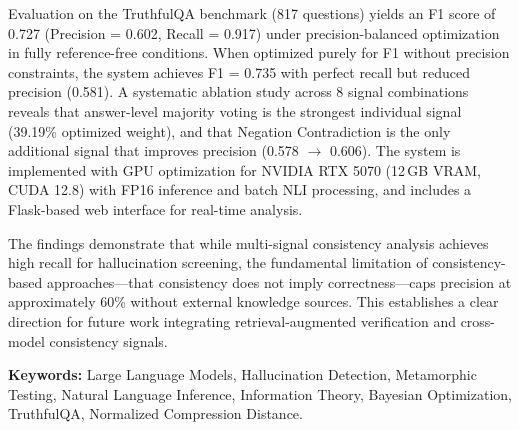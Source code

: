 Evaluation on the TruthfulQA benchmark (817 questions) yields an F1 score of 0.727 (Precision = 0.602, Recall = 0.917) under precision-balanced optimization in fully reference-free conditions. When optimized purely for F1 without precision constraints, the system achieves F1 = 0.735 with perfect recall but reduced precision (0.581). A systematic ablation study across 8 signal combinations reveals that answer-level majority voting is the strongest individual signal (39.19\% optimized weight), and that Negation Contradiction is the only additional signal that improves precision (0.578 $\rightarrow$ 0.606). The system is implemented with GPU optimization for NVIDIA RTX 5070 (12\,GB VRAM, CUDA 12.8) with FP16 inference and batch NLI processing, and includes a Flask-based web interface for real-time analysis.

The findings demonstrate that while multi-signal consistency analysis achieves high recall for hallucination screening, the fundamental limitation of consistency-based approaches---that consistency does not imply correctness---caps precision at approximately 60\% without external knowledge sources. This establishes a clear direction for future work integrating retrieval-augmented verification and cross-model consistency signals.

\vfill
\textbf{Keywords:} Large Language Models, Hallucination Detection, Metamorphic Testing, Natural Language Inference, Information Theory, Bayesian Optimization, TruthfulQA, Normalized Compression Distance.
\clearpage
